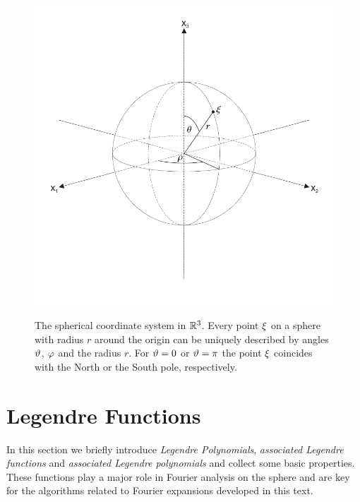 \begin{figure}[htb]
  \centering
  \includegraphics[height=12cm,width=12cm]{images/sphere}
  \caption{The spherical coordinate system in $\mathbb{R}^3$. Every point $\mathbf{\xi}$ on a
  sphere with radius $r$ around the origin can be uniquely described by angles 
  $\vartheta$, $\varphi$ and the radius $r$. For $\vartheta = 0$ or
  $\vartheta = \pi$ the point $\mathbf{\xi}$ coincides with the North or the South
  pole, respectively.}
  \label{sphere}
\end{figure}

\section{Legendre Functions}
\label{Basics:LegendreTypeFunctions}
In this section we briefly introduce \emph{Legendre Polynomials}, \emph{associated Legendre functions} 
and \emph{associated Legendre polynomials} and collect some basic properties. These functions play 
a major role in Fourier analysis on the sphere and are key for the algorithms related to Fourier 
expansions developed in this text.


